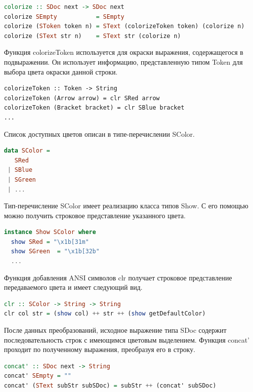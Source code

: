 \begin{lstlisting}[language=Haskell, caption=Окрашивание выражения]
colorize :: SDoc next -> SDoc next
colorize SEmpty           = SEmpty
colorize (SToken token n) = SText (colorizeToken token) (colorize n)
colorize (SText str n)    = SText str (colorize n)
\end{lstlisting}

Функция colorizeToken используется для окраски выражения, содержащегося в подвыражении. Он использует информацию, представленную типом Token для выбора цвета окраски данной строки.

\begin{lstlisting}
colorizeToken :: Token -> String
colorizeToken (Arrow arrow) = clr SRed arrow
colorizeToken (Bracket bracket) = clr SBlue bracket
...
\end{lstlisting}

Список доступных цветов описан в типе-перечислении SColor.

\begin{lstlisting}[language=Haskell]
data SColor = 
   SRed
 | SBlue
 | SGreen
 | ...
\end{lstlisting}

Тип-перечисление SColor имеет реализацию класса типов Show. С его помощью можно получить строковое представление указанного цвета.

\begin{lstlisting}[language=Haskell]
instance Show SColor where
  show SRed = "\x1b[31m"
  show SGreen  = "\x1b[32b"
  ...
\end{lstlisting}

Функция добавления ANSI символов clr получает строковое представление передаваемого цвета и имеет следующий вид.

\begin{lstlisting}[language=Haskell]
clr :: SColor -> String -> String
clr col str = (show col) ++ str ++ (show getDefaultColor)
\end{lstlisting}

После данных преобразований, исходное выражение типа SDoc содержит последовательность строк с имеющимся цветовым выделением. Функция concat' проходит по полученному выражения, преобразуя его в строку.

\begin{lstlisting}[language=Haskell]
concat' :: SDoc next -> String
concat' SEmpty = ""
concat' (SText subStr subSDoc) = subStr ++ (concat' subSDoc)
\end{lstlisting}



